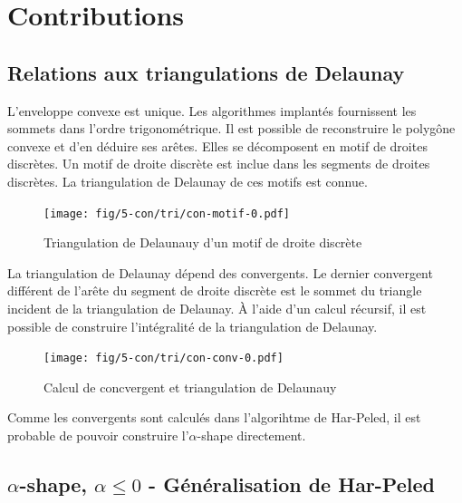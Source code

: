 \section{Contributions}

\subsection{Relations aux triangulations de Delaunay}


L'enveloppe convexe est unique. Les algorithmes implantés fournissent les sommets dans l'ordre trigonométrique. Il est possible de reconstruire le polygône convexe et d'en déduire ses arêtes. Elles se décomposent en motif de droites discrètes. Un motif de droite discrète est inclue dans les segments de droites discrètes. La triangulation de Delaunay de ces motifs est connue. \cite{RoussillonL11}\\

\begin{figure}[H]
  \centering
  \texttt{[image: fig/5-con/tri/con-motif-0.pdf]}
  \caption{Triangulation de Delaunauy d'un motif de droite discrète}
\end{figure}

La triangulation de Delaunay dépend des convergents. Le dernier convergent différent de l'arête du segment de droite discrète est le sommet du triangle incident de la triangulation de Delaunay. À l'aide d'un calcul récursif, il est possible de construire l'intégralité de la triangulation de Delaunay.

\begin{figure}[H]
  \centering
  \texttt{[image: fig/5-con/tri/con-conv-0.pdf]}
  \caption{Calcul de concvergent et triangulation de Delaunauy}
\end{figure}

Comme les convergents sont calculés dans l'algorihtme de Har-Peled, il est probable de pouvoir construire l'$\alpha$-shape directement. 

\subsection{$\alpha$-shape, $\alpha \leq 0$ - Généralisation de Har-Peled}

